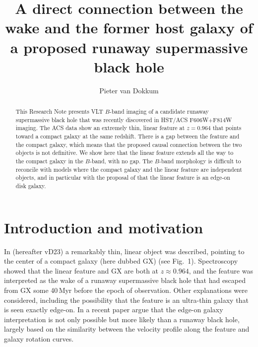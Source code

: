 \documentclass[RNAAS]{aastex62}
\begin{document}
\title{A direct connection between the wake and the former host galaxy of a proposed runaway supermassive black hole}


\author{Pieter van Dokkum}



\begin{abstract}

This Research Note presents VLT $B$-band imaging of a candidate runaway supermassive black hole
that was recently discovered in
HST/ACS F606W+F814W imaging. The ACS data
show an extremely thin, linear feature at $z=0.964$ that points toward a compact galaxy at
the same redshift.
There is a gap between the feature and the compact galaxy, which means that the proposed
causal connection between the two objects is not definitive. We show here that the
linear feature extends all the way to the compact
galaxy in the $B$-band, with no gap.  The $B$-band morphology is
difficult to reconcile with
models where the compact galaxy and the linear feature are independent objects, and in particular with
the proposal of \cite{s23} that the linear feature is an edge-on disk galaxy.


\end{abstract}


\gdef\blob{NGC\,1052-DF2}
\section{Introduction and motivation}
In \citet{vd23} (hereafter vD23) 
a remarkably thin, linear object  was described,
pointing to the center of a
compact galaxy (here dubbed GX) 
(see Fig.\ 1). Spectroscopy showed that the linear feature and 
GX are both at $z\approx 0.964$, and the feature was interpreted as the
wake of a runaway supermassive black hole that had escaped from GX some 40\,Myr before
the epoch of observation. Other explanations were considered, including the possibility that the
feature is an ultra-thin galaxy that is seen exactly edge-on. In a recent paper
\citet{s23} argue that the edge-on galaxy interpretation is not only possible but more
likely than a runaway black hole, largely based on the similarity between the velocity profile
along the feature and galaxy rotation curves.
\end{document}
